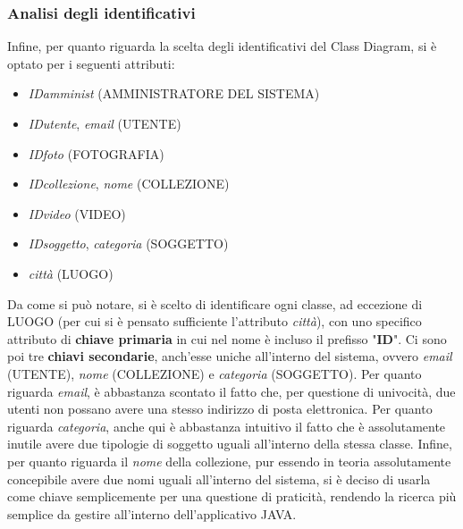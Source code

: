 \documentclass[a4paper]{article}
\begin{document}
        \vspace{20pt}		    
        \subsubsection{Analisi degli identificativi}
        \vspace{5pt}
        Infine, per quanto riguarda la scelta degli
        identificativi
        del Class Diagram, si è optato per i
        seguenti attributi:
        
        \begin{itemize}
        	\item \emph{ID\textunderscore amminist}
        	(AMMINISTRATORE DEL SISTEMA)
        	\item \emph{ID\textunderscore utente},
        	\emph{email} (UTENTE)
        	\item \emph{ID\textunderscore foto}
        	(FOTOGRAFIA)
        	\item \emph{ID\textunderscore collezione},
        	\emph{nome} (COLLEZIONE)
        	\item \emph{ID\textunderscore video} (VIDEO)
        	\item \emph{ID\textunderscore soggetto},
        	\emph{categoria} (SOGGETTO)
        	\item \emph{città} (LUOGO)
        \end{itemize}
        Da come si può notare, si è scelto di identificare
        ogni classe, ad eccezione di LUOGO (per cui si è
        pensato sufficiente l'attributo \emph{città}), con
        uno
        specifico
        attributo di \textbf{chiave primaria} in cui nel nome
        è incluso il prefisso "\textbf{ID}". Ci sono poi tre
        \textbf{chiavi secondarie}, anch'esse uniche
        all'interno del sistema, ovvero \emph{email}
        (UTENTE), \emph{nome} (COLLEZIONE) e \emph{categoria}
        (SOGGETTO). Per quanto riguarda \emph{email}, è
        abbastanza scontato il fatto che, per questione di
        univocità, due utenti non possano avere una stesso
        indirizzo di posta elettronica. Per quanto riguarda
        \emph{categoria}, anche qui è abbastanza intuitivo il
        fatto che è assolutamente inutile avere due tipologie
        di soggetto uguali all'interno della stessa classe.
        Infine, per quanto riguarda il \emph{nome} della
        collezione, pur essendo in teoria assolutamente
        concepibile avere due nomi uguali all'interno del
        sistema, si è deciso di usarla come chiave
        semplicemente per una questione di praticità,
        rendendo la ricerca più semplice da gestire
        all'interno dell'applicativo JAVA.
        
\end{document}
